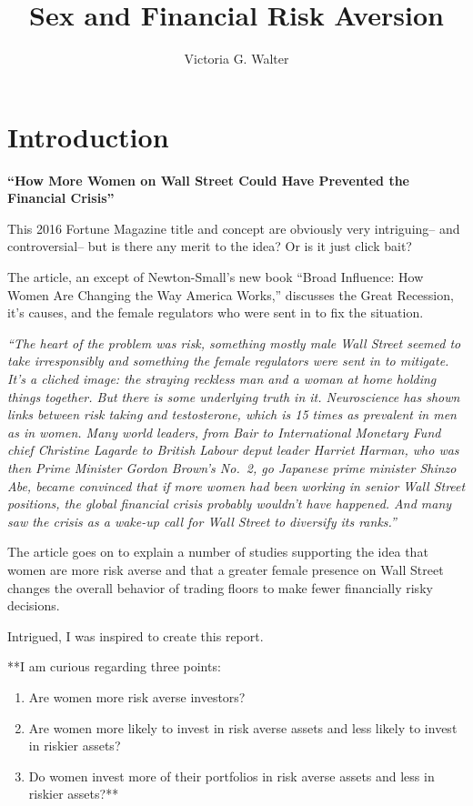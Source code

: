 \documentclass[
]{article}
\title{Sex and Financial Risk Aversion}
\author{Victoria G. Walter}
\date{}
\providecommand{\tightlist}{%
  \setlength{\itemsep}{0pt}\setlength{\parskip}{0pt}}
\begin{document}
\maketitle

{
\setcounter{tocdepth}{3}
\tableofcontents
}
\hypertarget{introduction}{%
\section{Introduction}\label{introduction}}

\textbf{``How More Women on Wall Street Could Have Prevented the
Financial Crisis''}

This 2016 Fortune Magazine title and concept are obviously very
intriguing-- and controversial-- but is there any merit to the idea? Or
is it just click bait?

The article, an except of Newton-Small's new book ``Broad Influence: How
Women Are Changing the Way America Works,'' discusses the Great
Recession, it's causes, and the female regulators who were sent in to
fix the situation.

\emph{``The heart of the problem was risk, something mostly male Wall
Street seemed to take irresponsibly and something the female regulators
were sent in to mitigate. It's a cliched image: the straying reckless
man and a woman at home holding things together. But there is some
underlying truth in it. Neuroscience has shown links between risk taking
and testosterone, which is 15 times as prevalent in men as in women.
Many world leaders, from Bair to International Monetary Fund chief
Christine Lagarde to British Labour deput leader Harriet Harman, who was
then Prime Minister Gordon Brown's No.~2, go Japanese prime minister
Shinzo Abe, became convinced that if more women had been working in
senior Wall Street positions, the global financial crisis probably
wouldn't have happened. And many saw the crisis as a wake-up call for
Wall Street to diversify its ranks.''}

The article goes on to explain a number of studies supporting the idea
that women are more risk averse and that a greater female presence on
Wall Street changes the overall behavior of trading floors to make fewer
financially risky decisions.

Intrigued, I was inspired to create this report.

**I am curious regarding three points:

\begin{enumerate}
\def\labelenumi{\arabic{enumi}.}
\tightlist
\item
  Are women more risk averse investors?
\item
  Are women more likely to invest in risk averse assets and less likely
  to invest in riskier assets?
\item
  Do women invest more of their portfolios in risk averse assets and
  less in riskier assets?**
\end{enumerate}
\end{document}
